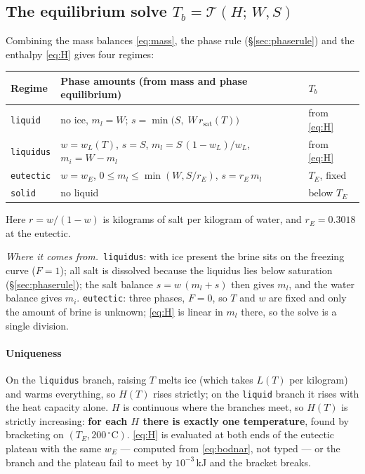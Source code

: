 \documentclass[11pt,a4paper]{article}
\newcommand{\dC}{\,^{\circ}\mathrm{C}}
\newcommand{\code}[1]{\texttt{#1}}
\newcommand{\where}{\par\noindent\textit{Where it comes from.}\ }
\begin{document}
\subsection{The equilibrium solve $T_b = \mathcal T(H;\,W, S)$}
Combining the mass balances \eqref{eq:mass}, the phase rule (§\ref{sec:phaserule}) and the enthalpy
\eqref{eq:H} gives four regimes:
\begin{center}\small
\begin{tabularx}{\linewidth}{@{}l X l@{}}
\toprule
Regime & Phase amounts (from mass and phase equilibrium) & $T_b$ \\ \midrule
\code{liquid} & no ice, $m_l = W$;\; $s = \min\!\big(S,\; W\,r_{\text{sat}}(T)\big)$ & from \eqref{eq:H} \\
\code{liquidus} & $w = w_L(T)$,\; $s = S$,\; $m_l = S\,(1-w_L)/w_L$,\; $m_i = W - m_l$ & from \eqref{eq:H} \\
\code{eutectic} & $w = w_E$,\; $0 \le m_l \le \min(W, S/r_E)$,\; $s = r_E\,m_l$ & $T_E$, fixed \\
\code{solid} & no liquid & below $T_E$ \\
\bottomrule
\end{tabularx}
\end{center}
Here $r = w/(1-w)$ is kilograms of salt per kilogram of water, and $r_E = 0.3018$ at the eutectic.
\where \code{liquidus}: with ice present the brine sits on the freezing curve ($F = 1$); all salt is
dissolved because the liquidus lies below saturation (§\ref{sec:phaserule}); the salt balance
$s = w\,(m_l + s)$ then gives $m_l$, and the water balance gives $m_i$. \code{eutectic}: three phases,
$F = 0$, so $T$ and $w$ are fixed and only the amount of brine is unknown; \eqref{eq:H} is linear in
$m_l$ there, so the solve is a single division.

\paragraph{Uniqueness} On the \code{liquidus} branch, raising $T$ melts ice (which takes $L(T)$ per
kilogram) and warms everything, so $H(T)$ rises strictly; on the \code{liquid} branch it rises with the
heat capacity alone. $H$ is continuous where the branches meet, so $H(T)$ is strictly increasing:
\textbf{for each $H$ there is exactly one temperature}, found by bracketing on $(T_E, 200\dC)$.
\eqref{eq:H} is evaluated at both ends of the eutectic plateau with the same $w_E$ — computed from
\eqref{eq:bodnar}, not typed — or the branch and the plateau fail to meet by $10^{-3}$\,kJ and the
bracket breaks.
\end{document}
